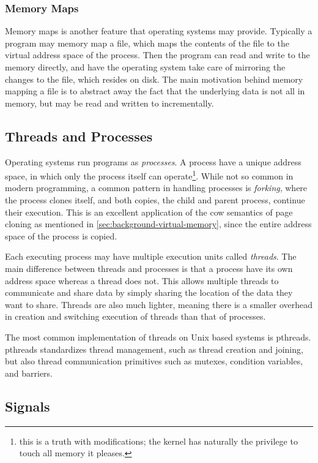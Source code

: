 \subsubsection{Memory Maps\label{sec:memory-map}}

Memory maps is another feature that operating systems may provide. Typically a program may memory
map a file, which maps the contents of the file to the virtual address space of the process. Then
the program can read and write to the memory directly, and have the operating system take care of
mirroring the changes to the file, which resides on disk.  The main motivation behind memory
mapping a file is to abstract away the fact that the underlying data is not all in memory, but may
be read and written to incrementally.


\subsection{Threads and Processes}

Operating systems run programs as \emph{processes}. A process have a unique address space, in which
only the process itself can operate\footnote{this is a truth with modifications; the kernel has
naturally the privilege to touch all memory it pleases.}.
While not so common in modern programming, a common pattern in handling processes is
\emph{forking}, where the process clones itself, and both copies, the child and parent process,
continue their execution. This is an excellent application of the \gls{cow} semantics of page
cloning as mentioned in \cref{sec:background-virtual-memory}, since the entire address space of the
process is copied.

Each executing process may have multiple execution units called \emph{threads}. The main difference
between threads and processes is that a process have its own address space whereas a thread does
not. This allows multiple threads to communicate and share data by simply sharing the location of
the data they want to share. Threads are also much lighter, meaning there is a smaller overhead in
creation and switching execution of threads than that of processes.

The most common implementation of threads on Unix based systems is \gls{pthreads}. \gls{pthreads}
standardizes thread management, such as thread creation and joining, but also thread communication
primitives such as mutexes, condition variables, and barriers.


\subsection{Signals\label{sec:background-signals}}

